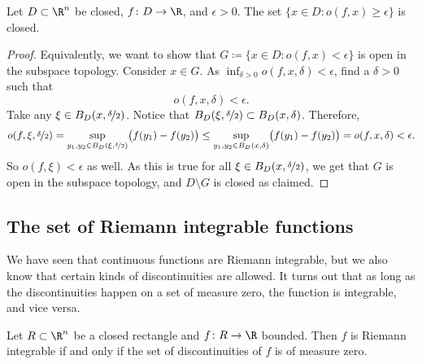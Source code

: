 \begin{prop} \label{prop:seclosed}
Let $D \subset \R^n$ be closed,
$f \colon D \to \R$, and $\epsilon > 0$.
The set $\bigl\{ x \in D : o(f,x) \geq \epsilon \bigr\}$ is closed.
\end{prop}

\begin{proof}
Equivalently, we want to show that
$G \coloneqq \bigl\{ x \in D : o(f,x) < \epsilon \bigr\}$ is open in the subspace topology.
Consider $x \in G$.
As $\inf_{\delta > 0} o(f,x,\delta) < \epsilon$, find a $\delta > 0$ such
that
\begin{equation*}
o(f,x,\delta) < \epsilon .
\end{equation*}
Take any $\xi \in B_D(x,\nicefrac{\delta}{2})$.  Notice that
$B_D(\xi,\nicefrac{\delta}{2}) \subset B_D(x,\delta)$.  Therefore,
\begin{equation*}
o(f,\xi,\nicefrac{\delta}{2}) =
\sup_{y_1,y_2 \in B_D(\xi,\nicefrac{\delta}{2})} \bigl(f(y_1)-f(y_2)\bigr) 
\leq
\sup_{y_1,y_2 \in B_D(x,\delta)} \bigl(f(y_1)-f(y_2)\bigr) = o(f,x,\delta) <
\epsilon .
\end{equation*}
So $o(f,\xi) < \epsilon$ as well.  As this is true for all $\xi \in
B_D(x,\nicefrac{\delta}{2})$, we get that $G$ is open in the subspace
topology, and $D \setminus G$ is closed as claimed.
\end{proof}


\subsection{The set of Riemann integrable functions}

We have seen that continuous functions are Riemann integrable, but we also
know that certain kinds of discontinuities are allowed.
It turns out that as long as the discontinuities happen on a set of measure
zero, the function is integrable, and vice versa.

\begin{thm}%
%
%
Let $R \subset \R^n$ be a closed rectangle and $f \colon R \to \R$
bounded.  Then $f$ is Riemann integrable if and only if
the set of discontinuities of $f$ is of measure zero.
\end{thm}

